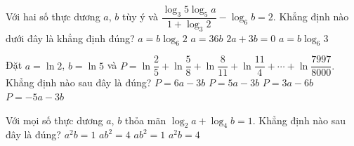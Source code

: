 \begin{ex}%
	Với hai số thực dương $a$, $b$ tùy ý và $\dfrac{\log _3 5 \log _5 a}{1+\log _3 2}-\log _6 b=2$. Khẳng định  nào dưới đây là khẳng định đúng?
	 \choice
		{$a=b \log _6 2$} 
		{\True $a=36  b$}
		{$2  a+3 b=0$}
		{$a=b \log _6 3$} 
\end{ex}

\begin{ex}%
	Đặt $a = \ln 2$, $b  = \ln 5$ và
	$ 
	P = \ln \dfrac{2}{5}  + \ln \dfrac{5}{8} + \ln \dfrac{8}{11} + \ln \dfrac{11}{4} + \cdots + \ln \dfrac{7997}{8000}.
	$ 
	Khẳng định nào sau đây là đúng? 
	\choice 
		{  $P = 6a - 3b$ }
		{ $P =  5a - 3b$ }
		{  $P = 3a - 6b$ }
		{ \True $P = -5a - 3b$  }
\end{ex}

\begin{ex}%
	Với mọi số thực dương $a$, $b$ thỏa mãn $\log_2 a + \log_4  b = 1$. Khẳng định nào sau đây là đúng?
	 \choice
		{ $a^2 b = 1$ } 
		{ $ab^2 = 4$ } 
		{ $ab^2 = 1$ } 
		 { \True $a^2 b = 4$ }
\end{ex}

